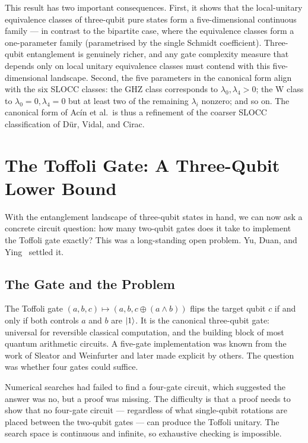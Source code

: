 \documentclass[12pt, a4paper, oneside]{report}
\theoremstyle{plain}
\theoremstyle{definition}
\theoremstyle{remark}
\begin{document}
This result has two important consequences. First, it shows that the local-unitary
equivalence classes of three-qubit pure states form a five-dimensional continuous family ---
in contrast to the bipartite case, where the equivalence classes form a one-parameter family
(parametrised by the single Schmidt coefficient). Three-qubit entanglement is genuinely
richer, and any gate complexity measure that depends only on local unitary equivalence
classes must contend with this five-dimensional landscape. Second, the five parameters in
the canonical form align with the six SLOCC classes: the GHZ class corresponds to
$\lambda_0, \lambda_4 > 0$; the W class to $\lambda_0 = 0, \lambda_4 = 0$ but at least two
of the remaining $\lambda_i$ nonzero; and so on. The canonical form of Acín et al.\ is thus
a refinement of the coarser SLOCC classification of Dür, Vidal, and Cirac.


\section{The Toffoli Gate: A Three-Qubit Lower Bound}
\label{sec:toffoli}

With the entanglement landscape of three-qubit states in hand, we can now ask a concrete
circuit question: how many two-qubit gates does it take to implement the Toffoli gate
exactly? This was a long-standing open problem. Yu, Duan, and Ying~\cite{yu2013} settled it.

\subsection{The Gate and the Problem}

The Toffoli gate $(a, b, c) \mapsto (a, b, c \oplus (a \wedge b))$ flips the target qubit
$c$ if and only if both controls $a$ and $b$ are $\ket{1}$. It is the canonical three-qubit
gate: universal for reversible classical computation, and the building block of most quantum
arithmetic circuits. A five-gate implementation was known from the work of Sleator and
Weinfurter and later made explicit by others. The question was whether four gates could
suffice.

Numerical searches had failed to find a four-gate circuit, which suggested the answer was
no, but a proof was missing. The difficulty is that a proof needs to show that no four-gate
circuit --- regardless of what single-qubit rotations are placed between the two-qubit gates
--- can produce the Toffoli unitary. The search space is continuous and infinite, so
exhaustive checking is impossible.
\end{document}
